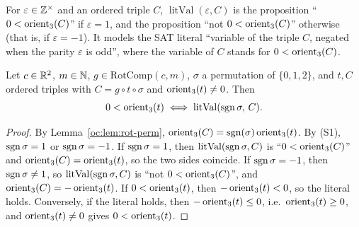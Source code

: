 \begin{definition}\label{oc:def:litval}
For $\varepsilon\in\mathbb Z^\times$ and an ordered triple $C$, $\operatorname{litVal}(\varepsilon,C)$ is the
proposition ``$0<\operatorname{orient}_3(C)$'' if $\varepsilon=1$, and the proposition ``not $0<\operatorname{orient}_3(C)$''
otherwise (that is, if $\varepsilon=-1$). It models the SAT literal ``variable of the triple $C$, negated
when the parity $\varepsilon$ is odd'', where the variable of $C$ stands for $0<\operatorname{orient}_3(C)$.
\end{definition}

\begin{theorem}\label{oc:thm:literal}
Let $c\in\mathbb R^2$, $m\in\mathbb N$, $g\in\mathrm{RotComp}(c,m)$, $\sigma$ a permutation of $\{0,1,2\}$, and $t,C$
ordered triples with $C=g\circ t\circ\sigma$ and $\operatorname{orient}_3(t)\ne0$. Then
\[0<\operatorname{orient}_3(t)\iff\operatorname{litVal}(\operatorname{sgn}\sigma,\,C).\]
\end{theorem}
\begin{proof}
By Lemma~\ref{oc:lem:rot-perm}, $\operatorname{orient}_3(C)=\operatorname{sgn}(\sigma)\operatorname{orient}_3(t)$. By (S1), $\operatorname{sgn}\sigma=1$ or
$\operatorname{sgn}\sigma=-1$.
If $\operatorname{sgn}\sigma=1$, then $\operatorname{litVal}(\operatorname{sgn}\sigma,C)$ is ``$0<\operatorname{orient}_3(C)$'' and
$\operatorname{orient}_3(C)=\operatorname{orient}_3(t)$, so the two sides coincide.
If $\operatorname{sgn}\sigma=-1$, then $\operatorname{sgn}\sigma\ne1$, so $\operatorname{litVal}(\operatorname{sgn}\sigma,C)$ is ``not
$0<\operatorname{orient}_3(C)$'', and $\operatorname{orient}_3(C)=-\operatorname{orient}_3(t)$. If $0<\operatorname{orient}_3(t)$, then $-\operatorname{orient}_3(t)<0$, so the
literal holds. Conversely, if the literal holds, then $-\operatorname{orient}_3(t)\le0$, i.e.\ $\operatorname{orient}_3(t)\ge0$, and
$\operatorname{orient}_3(t)\ne0$ gives $0<\operatorname{orient}_3(t)$.
\end{proof}

